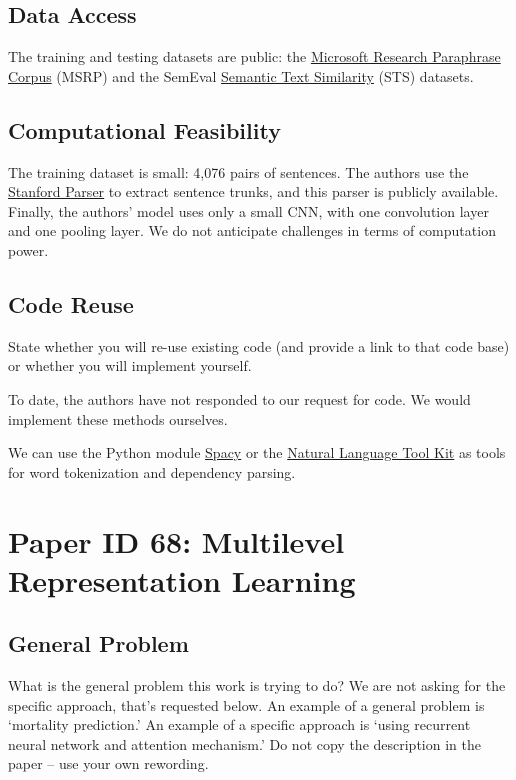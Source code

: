 \documentclass[11pt,a4paper]{article}
\begin{document}
\subsection{Data Access}
The training and testing datasets are public: the \href{https://www.microsoft.com/en-us/download/details.aspx?id=52398}{Microsoft Research Paraphrase Corpus} (MSRP) and the SemEval \href{https://github.com/brmson/dataset-sts/tree/master/data/sts/semeval-sts}{Semantic Text Similarity} (STS) datasets.

\subsection{Computational Feasibility}
The training dataset is small: 4,076 pairs of sentences. The authors use the \href{https://nlp.stanford.edu/software/lex-parser.shtml}{Stanford Parser} to extract sentence trunks, and this parser is publicly available. Finally, the authors' model uses only a small CNN, with one convolution layer and one pooling layer. We do not anticipate challenges in terms of computation power. 

\subsection{Code Reuse}
State whether you will re-use existing code (and provide a link to that code base) or whether you will implement yourself.

To date, the authors have not responded to our request for code. We would implement these methods ourselves. 

We can use the Python module \href{https://spacy.io/}{Spacy} or the \href{https://www.nltk.org/}{Natural Language Tool Kit} as tools for word tokenization and dependency parsing. 

\section{Paper ID 68: Multilevel Representation Learning}
\subsection{General Problem}
\cite{sohn_2020}
What is the general problem this work is trying to do? We are not asking for the specific approach, that’s requested below. An example of a general problem is ‘mortality prediction.’ An example of a specific approach is ‘using recurrent neural network and attention mechanism.’ Do not copy the description in the paper – use your own rewording.
\end{document}
